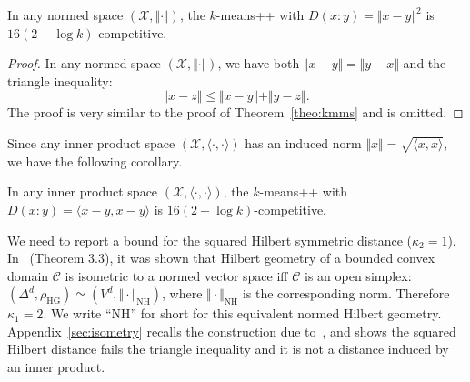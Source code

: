 \documentclass[graybox]{svmult}
\def\calX{\mathcal{X}}
\def\calC{\mathcal{C}}
\def\inner#1#2{ \langle {#1},{#2} \rangle }
\def\HG{\mathrm{HG}}
\def\NH{\mathrm{NH}}  %
\begin{document}
\begin{theorem}\label{theo:kmns}
In any normed space $(\calX,\Vert\cdot\Vert)$,
the $k$-means++ with $D(x:y)=\Vert{x-y}\Vert^2$ is $16(2+\log k)$-competitive.
\end{theorem}
\begin{proof}
In any normed space $(\calX,\Vert\cdot\Vert)$, 
we have both $\Vert{x-y}\Vert=\Vert{y-x}\Vert$
and the triangle inequality:
$$
\Vert{}x-z\Vert\le\Vert{x-y}\Vert+\Vert{y-z}\Vert.
$$
The proof is very similar to the proof of Theorem~\ref{theo:kmms} and is omitted.




\end{proof}

Since any inner product space $(\calX,\inner{\cdot}{\cdot})$ has an induced norm 
$\Vert{x}\Vert=\sqrt{\inner{x}{x}}$, we have the following corollary.
\begin{corollary}
In any inner product space $(\calX,\inner{\cdot}{\cdot})$, 
the $k$-means++ with $D(x:y)=\inner{x-y}{x-y}$ is $16(2+\log k)$-competitive.
\end{corollary}

We need to report a bound for the squared Hilbert symmetric distance ($\kappa_2=1$).
In~\cite{BH-2014} (Theorem 3.3), it was shown that Hilbert geometry of a bounded convex domain $\calC$ is isometric to a normed vector space iff
$\calC$ is an open simplex:  $(\Delta^d,\rho_\HG)\simeq (V^d,\Vert\cdot\Vert_\NH)$, where $\Vert\cdot\Vert_\NH$ is the corresponding norm.
Therefore $\kappa_1=2$. We write ``$\NH$'' for short for this equivalent normed Hilbert geometry.
Appendix~\ref{sec:isometry} recalls the construction due to~\cite{HilbertHarpe-1991},
and shows the squared Hilbert distance fails the triangle inequality
and it is not a distance induced by an inner product.
\end{document}
